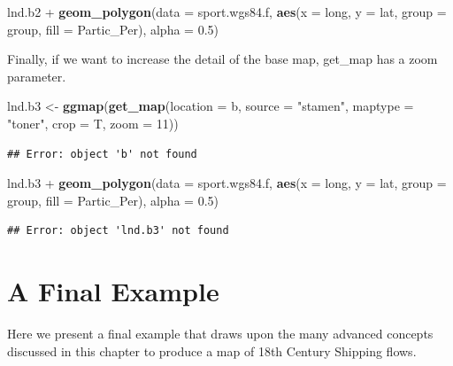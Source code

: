 \documentclass[]{article}
\newenvironment{Shaded}{}{}
\newcommand{\KeywordTok}[1]{\textcolor[rgb]{0.00,0.44,0.13}{\textbf{{#1}}}}
\newcommand{\DataTypeTok}[1]{\textcolor[rgb]{0.56,0.13,0.00}{{#1}}}
\newcommand{\DecValTok}[1]{\textcolor[rgb]{0.25,0.63,0.44}{{#1}}}
\newcommand{\FloatTok}[1]{\textcolor[rgb]{0.25,0.63,0.44}{{#1}}}
\newcommand{\StringTok}[1]{\textcolor[rgb]{0.25,0.44,0.63}{{#1}}}
\newcommand{\NormalTok}[1]{{#1}}
\begin{document}
\begin{Shaded}
\begin{Highlighting}[]
\NormalTok{lnd.b2 + }\KeywordTok{geom_polygon}\NormalTok{(}\DataTypeTok{data =} \NormalTok{sport.wgs84.f, }\KeywordTok{aes}\NormalTok{(}\DataTypeTok{x =} \NormalTok{long, }\DataTypeTok{y =} \NormalTok{lat, }\DataTypeTok{group =} \NormalTok{group, }
    \DataTypeTok{fill =} \NormalTok{Partic_Per), }\DataTypeTok{alpha =} \FloatTok{0.5}\NormalTok{)}
\end{Highlighting}
\end{Shaded}
Finally, if we want to increase the detail of the base map, get\_map has
a zoom parameter.

\begin{Shaded}
\begin{Highlighting}[]
\NormalTok{lnd.b3 <- }\KeywordTok{ggmap}\NormalTok{(}\KeywordTok{get_map}\NormalTok{(}\DataTypeTok{location =} \NormalTok{b, }\DataTypeTok{source =} \StringTok{"stamen"}\NormalTok{, }\DataTypeTok{maptype =} \StringTok{"toner"}\NormalTok{, }
    \DataTypeTok{crop =} \NormalTok{T, }\DataTypeTok{zoom =} \DecValTok{11}\NormalTok{))}
\end{Highlighting}
\end{Shaded}
\begin{verbatim}
## Error: object 'b' not found
\end{verbatim}
\begin{Shaded}
\begin{Highlighting}[]

\NormalTok{lnd.b3 + }\KeywordTok{geom_polygon}\NormalTok{(}\DataTypeTok{data =} \NormalTok{sport.wgs84.f, }\KeywordTok{aes}\NormalTok{(}\DataTypeTok{x =} \NormalTok{long, }\DataTypeTok{y =} \NormalTok{lat, }\DataTypeTok{group =} \NormalTok{group, }
    \DataTypeTok{fill =} \NormalTok{Partic_Per), }\DataTypeTok{alpha =} \FloatTok{0.5}\NormalTok{)}
\end{Highlighting}
\end{Shaded}
\begin{verbatim}
## Error: object 'lnd.b3' not found
\end{verbatim}
\section{A Final Example}

Here we present a final example that draws upon the many advanced
concepts discussed in this chapter to produce a map of 18th Century
Shipping flows.
\end{document}
